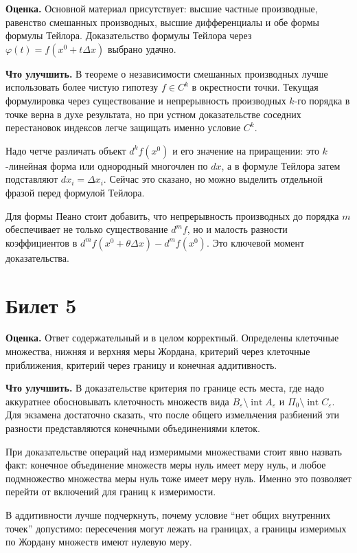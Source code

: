 \documentclass[12pt,a4paper]{article}
\begin{document}
\textbf{Оценка.} Основной материал присутствует: высшие частные производные,
равенство смешанных производных, высшие дифференциалы и обе формы формулы
Тейлора. Доказательство формулы Тейлора через
\(\varphi(t)=f(x^0+t\Delta x)\) выбрано удачно.

\textbf{Что улучшить.}
В теореме о независимости смешанных производных лучше использовать более
чистую гипотезу \(f\in C^k\) в окрестности точки. Текущая формулировка через
существование и непрерывность производных \(k\)-го порядка в точке верна в
духе результата, но при устном доказательстве соседних перестановок индексов
легче защищать именно условие \(C^k\).

Надо четче различать объект \(d^k f(x^0)\) и его значение на приращении:
это \(k\)-линейная форма или однородный многочлен по \(dx\), а в формуле
Тейлора затем подставляют \(dx_i=\Delta x_i\). Сейчас это сказано, но можно
выделить отдельной фразой перед формулой Тейлора.

Для формы Пеано стоит добавить, что непрерывность производных до порядка
\(m\) обеспечивает не только существование \(d^m f\), но и малость разности
коэффициентов в \(d^m f(x^0+\theta\Delta x)-d^m f(x^0)\). Это ключевой
момент доказательства.

\section*{Билет 5}

\textbf{Оценка.} Ответ содержательный и в целом корректный. Определены
клеточные множества, нижняя и верхняя меры Жордана, критерий через клеточные
приближения, критерий через границу и конечная аддитивность.

\textbf{Что улучшить.}
В доказательстве критерия по границе есть места, где надо аккуратнее
обосновывать клеточность множеств вида \(B_\varepsilon\setminus
\operatorname{int}A_\varepsilon\) и \(\Pi_0\setminus
\operatorname{int}C_\varepsilon\). Для экзамена достаточно сказать, что после
общего измельчения разбиений эти разности представляются конечными
объединениями клеток.

При доказательстве операций над измеримыми множествами стоит явно назвать
факт: конечное объединение множеств меры нуль имеет меру нуль, и любое
подмножество множества меры нуль тоже имеет меру нуль. Именно это позволяет
перейти от включений для границ к измеримости.

В аддитивности лучше подчеркнуть, почему условие ``нет общих внутренних
точек'' допустимо: пересечения могут лежать на границах, а границы измеримых
по Жордану множеств имеют нулевую меру.
\end{document}
